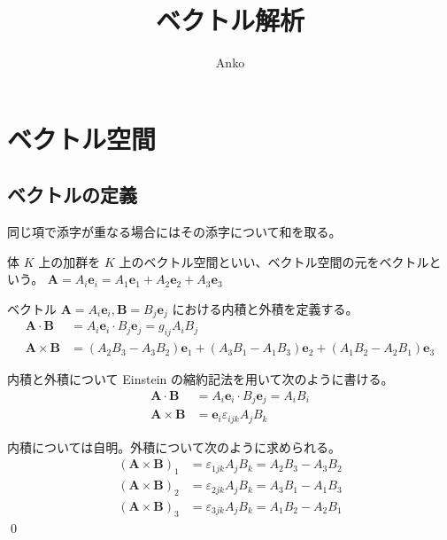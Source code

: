 \documentclass[uplatex,dvipdfmx,a4paper,11pt]{jlreq}
\title{ベクトル解析}
\author{Anko}
\makeatletter
\renewcommand{\AA}{\bm{A}}
\newcommand{\BB}{\bm{B}}
\newcommand{\ee}{\bm{e}}
\theoremstyle{definition}
\renewenvironment{proof}[1][\proofname]{\par
  \normalfont
  \topsep6\p@\@plus6\p@ \trivlist
  \item[\hskip\labelsep{\bfseries #1}\@addpunct{\bfseries}]\ignorespaces\quad\par
}{%
  \qed\endtrivlist\@endpefalse
}
\renewcommand\proofname{証明}
\makeatother
\begin{document}
\maketitle
\tableofcontents
\clearpage

\section{ベクトル空間}
\subsection{ベクトルの定義}
\begin{definition}
  同じ項で添字が重なる場合にはその添字について和を取る。
\end{definition}

\begin{definition}[ベクトル空間]
  体 $K$ 上の加群を $K$ 上のベクトル空間といい、ベクトル空間の元をベクトルという。
  $\AA = A_i\ee_i = A_1\ee_1 + A_2\ee_2 + A_3\ee_3$
\end{definition}

\begin{definition}[ベクトル空間における内積と外積]
  ベクトル $\AA = A_i\ee_i, \BB = B_j\ee_j$ における内積と外積を定義する。
  \begin{align}
    \AA\cdot\BB  & = A_i\ee_i\cdot B_j\ee_j = g_{ij}A_iB_j                                    \\
    \AA\times\BB & = (A_2B_3 - A_3B_2)\ee_1 + (A_3B_1 - A_1B_3)\ee_2 + (A_1B_2 - A_2B_1)\ee_3
  \end{align}
\end{definition}

\begin{theorem}
  内積と外積について Einstein の縮約記法を用いて次のように書ける。
  \begin{align}
    \AA\cdot\BB  & = A_i\ee_i\cdot B_j\ee_j = A_iB_i \\
    \AA\times\BB & = \bm{e}_i\varepsilon_{ijk}A_jB_k
  \end{align}
\end{theorem}
\begin{proof}
  内積については自明。外積について次のように求められる。
  \begin{align}
    (\AA\times\BB)_1 & = \varepsilon_{1jk}A_jB_k = A_2B_3 - A_3B_2 \\
    (\AA\times\BB)_2 & = \varepsilon_{2jk}A_jB_k = A_3B_1 - A_1B_3 \\
    (\AA\times\BB)_3 & = \varepsilon_{3jk}A_jB_k = A_1B_2 - A_2B_1
  \end{align}
\end{proof}
\end{document}

